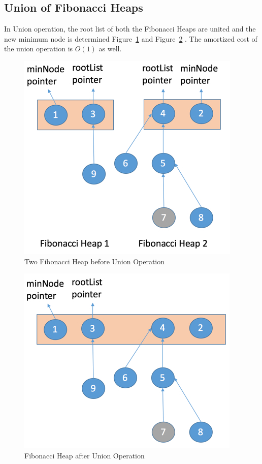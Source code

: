 \subsection{Union of Fibonacci Heaps}
In Union operation, the root list of both the Fibonacci Heaps are united  and the new minimum node is determined Figure~\ref{fig:Union1} and Figure~\ref{fig:Union2}  . The amortized cost of the union operation is $O(1)$ as well.

\begin{figure}[H]
	\includegraphics[width=0.95\columnwidth]{Figures/FibonacciHeapBeforeUnionOperation}
	\caption{Two Fibonacci Heap before Union Operation}
	\label{fig:Union1}
\end{figure}
\begin{figure}[H]
	\includegraphics[width=0.95\columnwidth]{Figures/FibonacciHeapAfterUnionOperation}
	\caption{Fibonacci Heap after Union Operation}
	\label{fig:Union2}
\end{figure}



